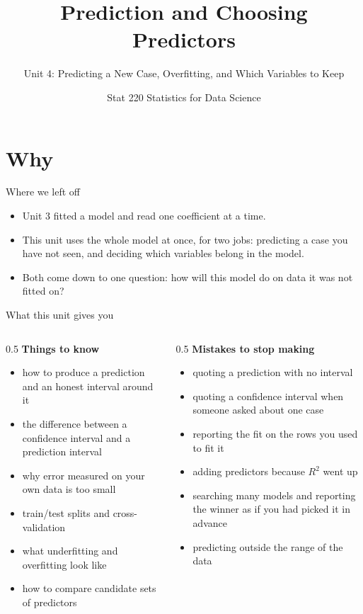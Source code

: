 \documentclass[aspectratio=169]{beamer}
\title{Prediction and Choosing Predictors}
\subtitle{Unit 4: Predicting a New Case, Overfitting, and Which Variables to Keep}
\author{Stat 220 \textbar{} Statistics for Data Science}
\date{}
\begin{document}
\begin{frame}
  \titlepage
\end{frame}

\section{Why}
\begin{frame}{Where we left off}
\begin{itemize}
  \item Unit 3 fitted a model and read one coefficient at a time.
  \item This unit uses the whole model at once, for two jobs: predicting a case you have
        not seen, and deciding which variables belong in the model.
  \item Both come down to one question: how will this model do on data it was not fitted on?
\end{itemize}
\end{frame}

\begin{frame}{What this unit gives you}
\begin{columns}[T]
\begin{column}{0.5\textwidth}
\textbf{Things to know}
\begin{itemize}\small
  \item how to produce a prediction and an honest interval around it
  \item the difference between a confidence interval and a prediction interval
  \item why error measured on your own data is too small
  \item train/test splits and cross-validation
  \item what underfitting and overfitting look like
  \item how to compare candidate sets of predictors
\end{itemize}
\end{column}
\begin{column}{0.5\textwidth}
\textbf{Mistakes to stop making}
\begin{itemize}\small
  \item quoting a prediction with no interval
  \item quoting a confidence interval when someone asked about one case
  \item reporting the fit on the rows you used to fit it
  \item adding predictors because $R^2$ went up
  \item searching many models and reporting the winner as if you had picked it in advance
  \item predicting outside the range of the data
\end{itemize}
\end{column}
\end{columns}
\end{frame}
\end{document}
